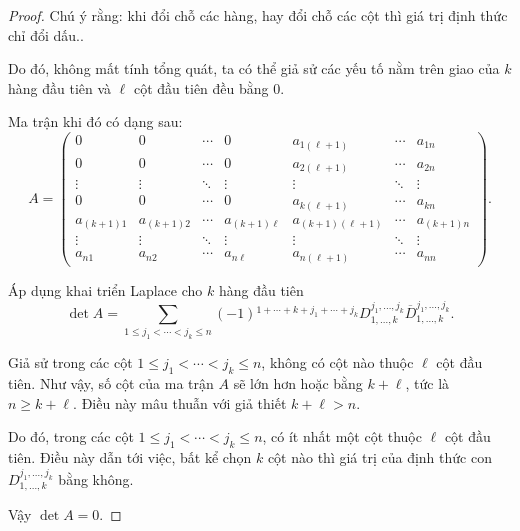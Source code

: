 \documentclass[class=linearalgebra,crop=false]{standalone}
\begin{document}
\begin{proof}
    \par Chú ý rằng: khi đổi chỗ các hàng, hay đổi chỗ các cột thì giá trị định thức chỉ đổi dấu..
    \par Do đó, không mất tính tổng quát, ta có thể giả sử các yếu tố nằm trên giao của $k$ hàng đầu tiên và $\ell$ cột đầu tiên đều bằng 0.
    \par Ma trận khi đó có dạng sau:
    \[
        A=
        \begin{pmatrix}
            0          & 0          & \cdots & 0             & a_{1(\ell+1)}     & \cdots & a_{1n}     \\
            0          & 0          & \cdots & 0             & a_{2(\ell+1)}     & \cdots & a_{2n}     \\
            \vdots     & \vdots     & \ddots & \vdots        & \vdots            & \ddots & \vdots     \\
            0          & 0          & \cdots & 0             & a_{k(\ell+1)}     & \cdots & a_{kn}     \\
            a_{(k+1)1} & a_{(k+1)2} & \cdots & a_{(k+1)\ell} & a_{(k+1)(\ell+1)} & \cdots & a_{(k+1)n} \\
            \vdots     & \vdots     & \ddots & \vdots        & \vdots            & \ddots & \vdots     \\
            a_{n1}     & a_{n2}     & \cdots & a_{n\ell}     & a_{n(\ell+1)}     & \cdots & a_{nn}
        \end{pmatrix}.
    \]
    \par Áp dụng khai triển Laplace cho $k$ hàng đầu tiên
    \[
        \det A = \sum_{1\le j_{1} < \cdots < j_{k}\le n}(-1){}^{1+\cdots+k+j_{1}+\cdots+j_{k}}D_{1,\ldots,k}^{j_{1},\ldots,j_{k}}\overline{D}_{1,\ldots,k}^{j_{1},\ldots,j_{k}}.
    \]
    \par Giả sử trong các cột $1\le j_{1} < \cdots < j_{k}\le n$, không có cột nào thuộc $\ell$ cột đầu tiên. Như vậy, số cột của ma trận $A$ sẽ lớn hơn hoặc bằng $k + \ell$, tức là $n \ge k + \ell$. Điều này mâu thuẫn với giả thiết $k + \ell > n$.
    \par Do đó, trong các cột $1\le j_{1} < \cdots < j_{k}\le n$, có ít nhất một cột thuộc $\ell$ cột đầu tiên. Điều này dẫn tới việc, bất kể chọn $k$ cột nào thì giá trị của định thức con  $D^{j_{1},\ldots,j_{k}}_{1,\ldots,k}$ bằng không.
    \par Vậy $\det A = 0$.
\end{proof}
\end{document}
